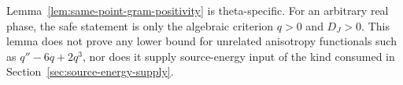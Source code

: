 \begin{remark}
\label{rem:scope-of-gram-positivity}
Lemma~\ref{lem:same-point-gram-positivity} is theta-specific.  For an
arbitrary real phase, the safe statement is only the algebraic
criterion \(q > 0\) and \(D_J > 0\).  This lemma does not prove any
lower bound for unrelated anisotropy functionals such as
\(q'' - 6q + 2q^3\), nor does it supply source-energy input of the
kind consumed in Section~\ref{sec:source-energy-supply}.
\end{remark}
